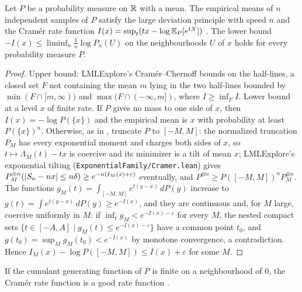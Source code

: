 \begin{lemma}
  \label{lem:cramer}
  \leanok
  Let $P$ be a probability measure on $\mathbb{R}$ with a mean. The empirical means of $n$ independent
  samples of $P$ satisfy the large deviation principle with speed $n$ and the Cramér rate function
  $I(x) = \sup_t (t x - \log \mathbb{E}_P[e^{t X}])$ \cite[Theorem 2.2.3]{DZ98}. The lower bound
  $-I(x) \le \liminf_n \frac1n \log P_n(U)$ on the neighbourhoods $U$ of $x$ holds for every
  probability measure $P$.
\end{lemma}

\begin{proof}
  \leanok
  Upper bound: LMLExplore's Cramér--Chernoff bounds on the half-lines, a closed set $F$ not
  containing the mean $m$ lying in the two half-lines bounded by $\min(F \cap [m, \infty))$ and
  $\max(F \cap (-\infty, m])$, where $I \ge \inf_F I$.
  Lower bound at a level $x$ of finite rate. If $P$ gives no mass to one side of $x$, then
  $I(x) = -\log P(\{x\})$ and the empirical mean is $x$ with probability at least $P(\{x\})^n$.
  Otherwise, as in \cite{DZ98}, truncate $P$ to $[-M, M]$: the normalized truncation $P_M$ has every
  exponential moment and charges both sides of $x$, so $t \mapsto \Lambda_M(t) - t x$ is coercive
  and its minimizer is a tilt of mean $x$; LMLExplore's exponential tilting
  (\texttt{ExponentialFamily/Cramer.lean}) gives $P_M^{\otimes n}(\lvert S_n - n x \rvert \le n \delta) \ge
  e^{-n (I_M(x) + \varepsilon)}$ eventually, and $P^{\otimes n} \ge P([-M, M])^n P_M^{\otimes n}$.
  The functions $g_M(t) = \int_{[-M, M]} e^{t (y - x)} \, dP(y)$ increase to $g(t) = \int e^{t (y - x)}
  \, dP(y) \ge e^{-I(x)}$, and they are continuous and, for $M$ large, coercive uniformly in $M$:
  if $\inf_t g_M < e^{-I(x) - \varepsilon}$ for every $M$, the nested compact sets
  $\{t \in [-A, A] \mid g_M(t) \le e^{-I(x) - \varepsilon}\}$ have a common point $t_0$, and
  $g(t_0) = \sup_M g_M(t_0) < e^{-I(x)}$ by monotone convergence, a contradiction. Hence
  $I_M(x) - \log P([-M, M]) \le I(x) + \varepsilon$ for some $M$.
\end{proof}

\begin{lemma}
  \label{lem:rate_good}
  \leanok
  If the cumulant generating function of $P$ is finite on a neighbourhood of $0$, the Cramér rate
  function is a good rate function \cite[Lemma 2.2.5]{DZ98}.
\end{lemma}

